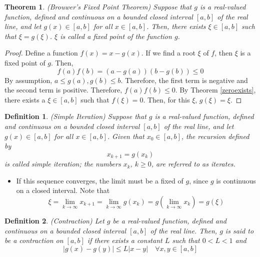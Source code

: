 \documentclass[12pt]{article}
\newtheorem{theorem}{Theorem}
\newtheorem{definition}{Definition}
\theoremstyle{definition}
\begin{document}
\begin{theorem}(Brouwer's Fixed Point Theorem)
Suppose that $g$ is a real-valued function, defined and continuous on a bounded closed interval $[a,b]$ of the real line, and let $g(x) \in [a,b]$ for all $x \in [a,b]$. Then, there exists $\xi \in [a,b]$ such that $\xi = g(\xi)$. $\xi$ is called a fixed point of the function $g$. 
\end{theorem}
\begin{proof}
Define a function $f(x) = x - g(x)$. If we find a root $\xi$ of $f$, then $\xi$ is a fixed point of $g$. Then,
\begin{equation}
f(a)f(b) = (a - g(a))(b-g(b)) \leq 0
\end{equation}
By assumption, $a \leq g(a), g(b) \leq b$. Therefore, the first term is negative and the second term is positive. Therefore, $f(a)f(b) \leq 0$. By Theorem \ref{zeroexists}, there exists a $\xi \in [a,b]$ such that $f(\xi)=0$. Then, for this $\xi$, $g(\xi) = \xi$.
\end{proof}

\begin{definition}(Simple Iteration)
Suppose that $g$ is a real-valued function, defined and continuous on a bounded closed interval $[a,b]$ of the real line, and let $g(x) \in [a,b]$ for all $x \in [a,b]$. Given that $x_0 \in [a,b]$, the recursion defined by 
\begin{equation}
x_{k+1} = g(x_k)
\end{equation}
is called simple iteration; the numbers $x_k$, $k \geq 0$, are referred to as iterates.
\end{definition}

\begin{itemize}
\item If this sequence converges, the limit must be a fixed of $g$, since $g$ is continuous on a closed interval. Note that
\begin{equation}
\xi = \lim_{k \to \infty} x_{k+1} = \lim_{k \to \infty} g(x_k) = g\left( \lim_{k \to \infty} x_k \right) = g(\xi)
\end{equation}
\end{itemize}

\begin{definition}(Contraction)
Let $g$ be a real-valued function, defined and continuous on a bounded closed interval $[a,b]$ of the real line. Then, $g$ is said to be a contraction on $[a,b]$ if there exists a constant $L$ such that $0<L<1$ and 
\begin{equation}
|g(x)-g(y)| \leq L|x-y| \quad \forall x,y \in [a,b]
\end{equation}
\end{definition}
\end{document}
